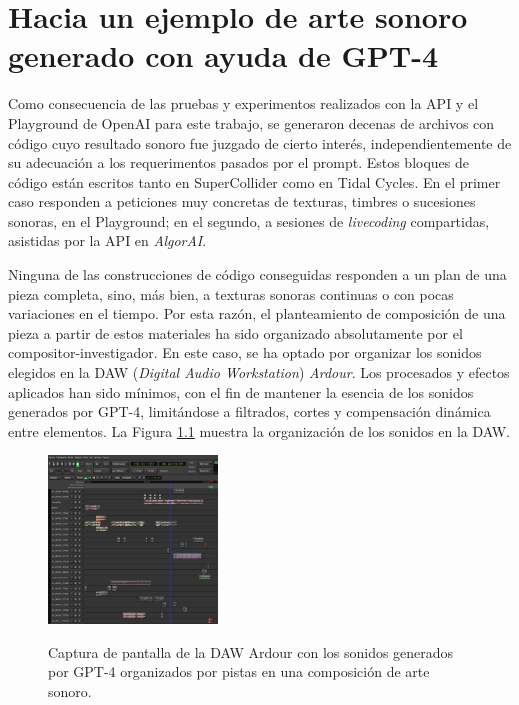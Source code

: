 \chapter{Hacia un ejemplo de arte sonoro generado con ayuda de GPT-4}

Como consecuencia de las pruebas y experimentos realizados con la API y el Playground de OpenAI para este trabajo, se generaron decenas de archivos con código cuyo resultado sonoro fue juzgado de cierto interés, independientemente de su adecuación a los requerimentos pasados por el prompt. Estos bloques de código están escritos tanto en SuperCollider como en Tidal Cycles. En el primer caso responden a peticiones muy concretas de texturas, timbres o sucesiones sonoras, en el Playground; en el segundo, a sesiones de \textit{livecoding} compartidas, asistidas por la API en \textit{AlgorAI}.

Ninguna de las construcciones de código conseguidas responden a un plan de una pieza completa, sino, más bien, a texturas sonoras continuas o con pocas variaciones en el tiempo. Por esta razón, el planteamiento de composición de una pieza a partir de estos materiales ha sido organizado absolutamente por el compositor-investigador. En este caso, se ha optado por organizar los sonidos elegidos en la DAW (\textit{Digital Audio Workstation}) \textit{Ardour}. Los procesados y efectos aplicados han sido mínimos, con el fin de mantener la esencia de los sonidos generados por GPT-4, limitándose a filtrados, cortes y compensación dinámica entre elementos. La Figura \ref{fig:ardour} muestra la organización de los sonidos en la DAW.

\begin{figure}[H]
    \caption[Captura de pantalla de la DAW Ardour con los sonidos generados por GPT-4 organizados en pistas]{Captura de pantalla de la DAW Ardour con los sonidos generados por GPT-4 organizados por pistas en una composición de arte sonoro.}
    \centering
    \includegraphics[width=0.4\textwidth]{./figuras/ardour.png}
    \label{fig:ardour}
\end{figure}

